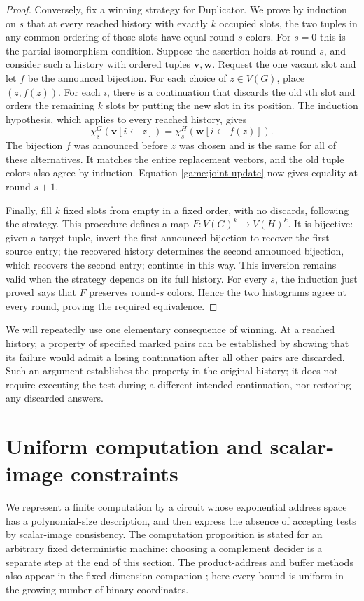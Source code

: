 \documentclass[11pt]{article}
\theoremstyle{definition}
\begin{document}
\begin{proof}
Conversely, fix a winning strategy for Duplicator.  We prove by induction
on $s$ that at every reached history with exactly $k$ occupied slots, the
two tuples in any common ordering of those slots have equal round-$s$
colors.  For $s=0$ this is the partial-isomorphism condition.  Suppose the
assertion holds at round $s$, and consider such a history with ordered
tuples $\mathbf v,\mathbf w$.  Request the one vacant slot and let $f$ be
the announced bijection.  For each choice of $z\in V(G)$, place
$(z,f(z))$.  For each $i$, there is a continuation that discards the old
$i$th slot and orders the remaining $k$ slots by putting the new slot in
its position.  The induction hypothesis, which applies to every reached
history, gives
\[
 \chi_s^G(\mathbf v[i\leftarrow z])
 =\chi_s^H(\mathbf w[i\leftarrow f(z)]).
\]
The bijection $f$ was announced before $z$ was chosen and is the same for
all of these alternatives.  It matches the entire replacement vectors,
and the old tuple colors also agree by induction.  Equation
\eqref{game:joint-update} now gives equality at round $s+1$.

Finally, fill $k$ fixed slots from empty in a fixed order, with no
discards, following the strategy.  This procedure defines a map
$F:V(G)^k\to V(H)^k$.  It is bijective: given a target tuple, invert the
first announced bijection to recover the first source entry; the recovered
history determines the second announced bijection, which recovers the
second entry; continue in this way.  This inversion remains valid when
the strategy depends on its full history.  For every $s$, the induction
just proved says that $F$ preserves round-$s$ colors.  Hence the two
histograms agree at every round, proving the required equivalence.
\end{proof}

We will repeatedly use one elementary consequence of winning.  At a
reached history, a property of specified marked pairs can be established
by showing that its failure would admit a losing continuation after all
other pairs are discarded.  Such an argument establishes the property
in the original history; it does not require executing the test during a
different intended continuation, nor restoring any discarded answers.

\section{Uniform computation and scalar-image constraints}\label{sec:computation}

We represent a finite computation by a circuit whose exponential address
space has a polynomial-size description, and then express the absence of
accepting tests by scalar-image consistency. The computation proposition
is stated for an arbitrary fixed deterministic machine: choosing a
complement decider is a separate step at the end of this section.
The product-address and buffer methods also appear in the fixed-dimension
companion \citep[Sections~3--4]{CompanionFixedDimension}; here every bound
is uniform in the growing number of binary coordinates.
\end{document}
